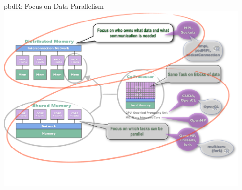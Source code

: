 \begin{frame}
  \begin{block}{pbdR: Focus on Data Parallelism}
    \includegraphics[width=0.95\textwidth]{../common/pics/ParallelHardware11.pdf}
  \end{block}
\end{frame}


